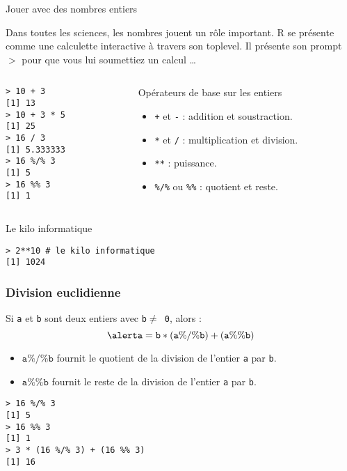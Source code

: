 \documentclass[10pt]{beamer}
\begin{document}
\begin{frame}[fragile]{Jouer avec des nombres entiers}
  \begin{alertblock}{Dans toutes les sciences, les nombres jouent un rôle important.}
    R se présente comme une calculette interactive à travers son \alert{toplevel}.
    Il présente son \alert{prompt $>$} pour que vous lui soumettiez un calcul \dots
  \end{alertblock}
  
\begin{columns}[t]
\begin{column}{0.38\textwidth}
\begin{lstlisting}
> 10 + 3
[1] 13
> 10 + 3 * 5
[1] 25
> 16 / 3
[1] 5.333333
> 16 %/% 3
[1] 5
> 16 %% 3
[1] 1
\end{lstlisting}
\end{column}
\begin{column}{0.58\textwidth}
  \begin{block}{Opérateurs de base sur les entiers}
    \begin{itemize}
    \item \texttt{+} et \texttt{-} : addition et soustraction.
    \item \texttt{*} et \texttt{/} : multiplication et division.
    \item \texttt{**} : puissance.
    \item \texttt{\%/\%} ou \texttt{\%\%} : quotient et reste.
    \end{itemize}
  \end{block}
\end{column}
\end{columns}
\begin{exampleblock}{Le kilo informatique}
\begin{lstlisting}[style=block]
> 2**10 # le kilo informatique  
[1] 1024
\end{lstlisting}  
\end{exampleblock}
\end{frame}

\begin{frame}[fragile]
  \frametitle{Division euclidienne}
  Si \texttt{a} et \texttt{b} sont deux entiers avec \texttt{b$\neq$ 0}, alors :
  \[
    \alert{\mathtt{a = b * (a \%/\% b) + (a \%\% b)}}
  \]
  \begin{itemize}
  \item \alert{$\mathtt{a \%/\% b}$} fournit le \alert{quotient} de la division de l'entier \texttt{a} par \texttt{b}.
  \item \alert{$\mathtt{a \%\% b}$} fournit le \alert{reste} de la division de l'entier \texttt{a} par \texttt{b}.

  \end{itemize}


  \begin{lstlisting}
> 16 %/% 3
[1] 5
> 16 %% 3
[1] 1
> 3 * (16 %/% 3) + (16 %% 3)
[1] 16    
  \end{lstlisting}
\end{frame}
\end{document}
